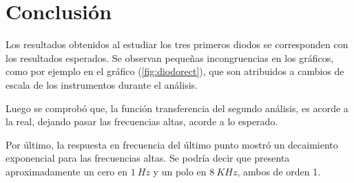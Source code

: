\documentclass[a4paper]{article}
\begin{document}
\section*{Conclusión}

Los resultados obtenidos al estudiar los tres primeros diodos se corresponden con los resultados esperados. Se observan pequeñas incongruencias en los gráficos, como por ejemplo en el gráfico (\ref{fig:diodorect}), que son atribuidos a cambios de escala de los instrumentos durante el análisis.

Luego se comprobó que, la función transferencia del segundo análisis, es acorde a la real, dejando pasar las frecuencias altas, acorde a lo esperado.

Por último, la respuesta en frecuencia del último punto mostró un decaimiento exponencial para las frecuencias altas. Se podría decir que presenta aproximadamente un cero en $1 \ Hz$ y un polo en $8 \ KHz$, ambos de orden 1. 
\end{document}
